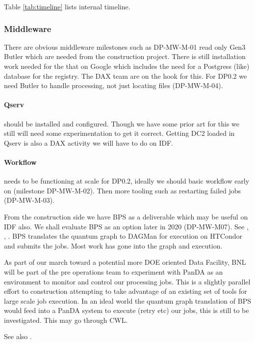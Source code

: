 
Table \ref{tab:timeline} lists internal timeline.

\subsubsection{Middleware}
There are obvious middleware milestones such as DP-MW-M-01 read only Gen3 Butler which are needed from the construction project.
There is still installation work needed for the that on Google which includes the need for a Postgress (like) database for the registry. The DAX team are on the hook for this.
For DP0.2 we need Butler to handle processing, not just locating files (DP-MW-M-04).

\paragraph{Qserv} should be installed  and configured. Though we have some prior art for this we
still will need some experimentation to get it correct. Getting DC2 loaded in Qserv is also a DAX activity
we will have to do on IDF.

\paragraph{Workflow} needs to be functioning at scale for DP0.2, ideally we should basic workflow
early on (milestone DP-MW-M-02). Then more tooling such as restarting failed jobs (DP-MW-M-03).

From the construction side we have BPS as a deliverable which may be useful on IDF also.
We shall evaluate BPS as an option later in 2020 (DP-MW-M07).
See , , .
BPS translates the quantum graph to DAGMan for execution on HTCondor and submits the jobs.
Most work has gone into the graph and execution.

As part of our march toward a potential more DOE oriented Data Facility, BNL will be part of the pre operations team to experiment with PanDA as an environment to monitor and control our processing jobs.
This is a slightly parallel effort to construction attempting to take advantage of an existing set of tools for large scale job execution.
In an ideal world the quantum graph translation of BPS would feed into a PanDA system to execute (retry etc) our jobs, this is still to be investigated. This may go through CWL.

See also .




